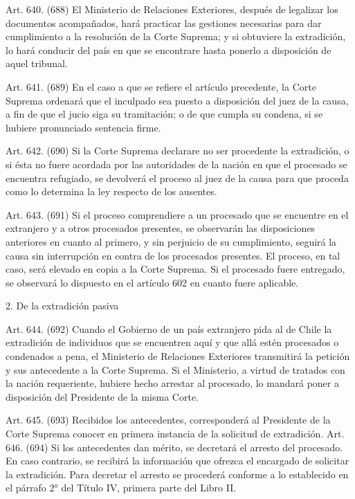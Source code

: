     Art. 640. (688) El Ministerio de Relaciones Exteriores, después de legalizar los documentos acompañados, hará practicar las gestiones necesarias para dar cumplimiento a la resolución de la Corte Suprema; y si obtuviere la extradición, lo hará conducir del país en que se encontrare hasta ponerlo a disposición de aquel tribunal.

    Art. 641. (689) En el caso a que se refiere el artículo precedente, la Corte Suprema ordenará que el inculpado sea puesto a disposición del juez de la causa, a fin de que el jucio siga su tramitación; o de que cumpla su condena, si se hubiere pronunciado sentencia firme.

    Art. 642. (690) Si la Corte Suprema declarare no ser procedente la extradición, o si ésta no fuere acordada por las autoridades de la nación en que el procesado se encuentra refugiado, se devolverá el proceso al juez de la causa para que proceda como lo determina la ley  respecto de los ausentes.


    Art. 643. (691) Si el proceso comprendiere a un procesado que se encuentre en el extranjero y a otros procesados presentes, se observarán las disposiciones anteriores en cuanto al primero, y sin perjuicio de su cumplimiento, seguirá la causa sin interrupción en contra de los procesados presentes. El proceso, en tal caso, será elevado en copia a la Corte Suprema.
    Si el procesado fuere entregado, se observará lo dispuesto en el artículo 602 en cuanto fuere aplicable.



  2. De la extradición pasiva

    Art. 644. (692) Cuando el Gobierno de un país extranjero pida al de Chile la extradición de individuos que se encuentren aquí y que allá estén procesados o condenados a pena, el Ministerio de Relaciones Exteriores transmitirá la petición y sus antecedente a la Corte Suprema.
    Si el Ministerio, a virtud de tratados con la nación requeriente, hubiere hecho arrestar al procesado, lo mandará poner a disposición del Presidente de la misma Corte.



    Art. 645. (693) Recibidos los antecedentes, corresponderá al Presidente de la Corte Suprema conocer en primera instancia de la solicitud de extradición.
    Art. 646. (694) Si los antecedentes dan mérito, se decretará el arresto del procesado. En caso contrario, se recibirá la información que ofrezca el encargado de solicitar la extradición.
    Para decretar el arresto se procederá conforme a lo establecido en el párrafo 2° del Título IV, primera parte del Libro II.


